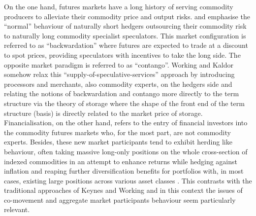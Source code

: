 \documentclass[
  authoryear,
  preprint,
  3p]{elsarticle}
\begin{document}
On the one hand, futures markets have a long history of serving
commodity producers to alleviate their commodity price and output risks.
\citet{keynes_treatise_1930} and \citet{hicks_value_1939} emphasise the
``normal'' behaviour of naturally short hedgers outsourcing their
commodity risk to naturally long commodity specialist speculators. This
market configuration is referred to as ``backwardation'' where futures
are expected to trade at a discount to spot prices, providing
speculators with incentives to take the long side. The opposite market
paradigm is referred to as ``contango''. Working
\citep{working_price_1933, working_theory_1948, working_hedging_1953}
and Kaldor \citep{kaldor_speculation_1939} somehow relax this
``supply-of-speculative-services'' \citep{till_long_2007} approach by
introducing processors and merchants, also commodity experts, on the
hedgers side and relating the notions of backwardation and contango more
directly to the term structure via the theory of storage where the shape
of the front end of the term structure (basis) is directly related to
the market price of storage.\\
Financialisation, on the other hand, refers to the entry of financial
investors into the commodity futures markets who, for the most part, are
not commodity experts. Besides, these new market participants tend to
exhibit herding like behaviour, often taking massive long-only positions
on the whole cross-section of indexed commodities in an attempt to
enhance returns while hedging against inflation and reaping further
diversification benefits for portfolios with, in most cases, existing
large positions across various asset classes
\citep{brunetti_speculators_2016, boyd_prevalence_2016, cheng_convective_2014, juvenal_speculation_2015, singleton_investor_2013, tang_index_2012}.
This contrasts with the traditional approaches of Keynes and Working and
in this context the issues of co-movement and aggregate market
participants behaviour seem particularly relevant.

\medskip
\end{document}
